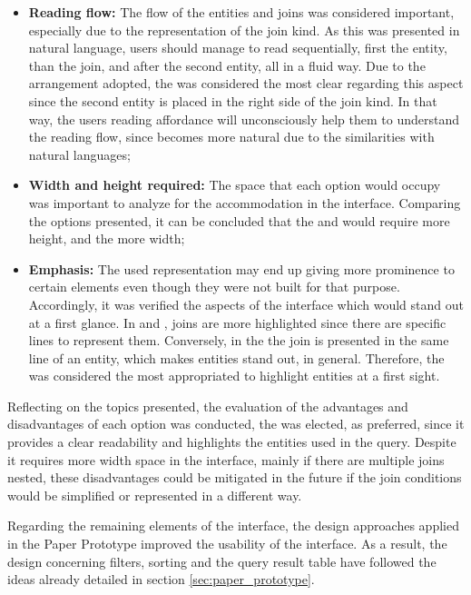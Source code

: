 \begin{itemize}
  \item \textbf{Reading flow: } The flow of the entities and joins was considered important, especially due to the representation of the join kind. As this was presented in natural language, users should manage to read sequentially, first the entity, than the join, and after the second entity, all in a fluid way. Due to the arrangement adopted, the  was considered the most clear regarding this aspect since the second entity is placed in the right side of the join kind. In that way, the users reading affordance will unconsciously help them to understand the reading flow, since becomes more natural due to the similarities with natural languages;
  \item \textbf{Width and height required: }The space that each option would occupy was important to analyze for the accommodation in the interface. Comparing the options presented, it can be concluded that the  and  would require more height, and the  more width;
  \item \textbf{Emphasis: }The used representation may end up giving more prominence to certain elements even though they were not built for that purpose. Accordingly, it was verified the aspects of the interface which would stand out at a first glance. In  and , joins are more highlighted since there are specific lines to represent them. Conversely, in the  the join is presented in the same line of an entity, which makes entities stand out, in general. Therefore, the  was considered the most appropriated to highlight entities at a first sight.
\end{itemize}

Reflecting on the topics presented, the evaluation of the advantages and disadvantages of each option was conducted, the  was elected, as preferred, since it provides a clear readability and highlights the entities used in the query. Despite it requires more width space in the interface, mainly if there are multiple joins nested, these disadvantages could be mitigated in the future if the join conditions would be simplified or represented in a different way.

Regarding the remaining elements of the interface, the design approaches applied in the Paper Prototype improved the usability of the interface. As a result, the design concerning filters, sorting and the query result table have followed the ideas already detailed in section \ref{sec:paper_prototype}.


